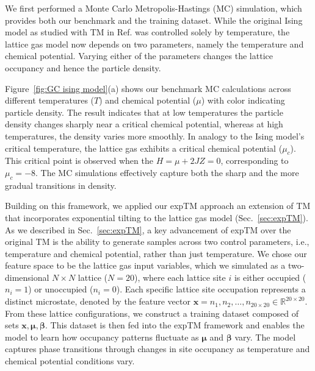 \documentclass[aip,jcp,reprint,longbibliography]{revtex4-1}
\begin{document}
We first performed a Monte Carlo Metropolis-Hastings (MC) simulation, which provides both our benchmark and the training dataset. While the original Ising model as studied with TM in Ref.  was controlled solely by temperature, the lattice gas model now depends on two parameters, namely the temperature and chemical potential. Varying either of the parameters changes the lattice occupancy and hence the particle density.


Figure~\ref{fig:GC ising model}(a) shows our benchmark MC calculations across different temperatures ($T$) and chemical potential ($\mu$) with color indicating particle density.
The result indicates that at low temperatures the particle density changes sharply near a critical chemical potential, whereas at high temperatures, the density varies more smoothly.  In analogy to the Ising model’s critical temperature, the lattice gas exhibits a critical chemical potential  ($\mu_c$). This critical point is observed when the $H = \mu + 2JZ = 0$, corresponding to $\mu_c = -8$. The MC simulations effectively capture both the sharp and the more gradual transitions in density.

Building on this framework, we applied our expTM approach an extension of TM that incorporates exponential tilting to the lattice gas model (Sec.~\ref{sec:expTM}). As we described in Sec.~\ref{sec:expTM}, a key advancement of expTM over the original TM is the ability to generate samples across two control parameters, i.e., temperature and chemical potential, rather than just temperature. We chose our feature space to be the lattice gas input variables, which we simulated as a two-dimensional $ N \times N $ lattice ($ N = 20 $), where each lattice site $ i $ is either occupied ($ n_i = 1 $) or unoccupied ($ n_i = 0 $). Each specific lattice site occupation represents a distinct microstate, denoted by the feature vector $\mathbf{x} = { n_1, n_2, \dots, n_{20\times20} } \in \mathbb{R}^{20\times20}$. From these lattice configurations, we construct a training dataset composed of sets ${\mathbf{x}, \boldsymbol{\mu}, \boldsymbol{\beta}}$. This dataset is then fed into the expTM framework and enables the model to learn how occupancy patterns fluctuate as $\boldsymbol{\mu}$ and $\boldsymbol{\beta}$ vary. The model captures phase transitions through changes in site occupancy as temperature and chemical potential conditions vary. 
\end{document}
